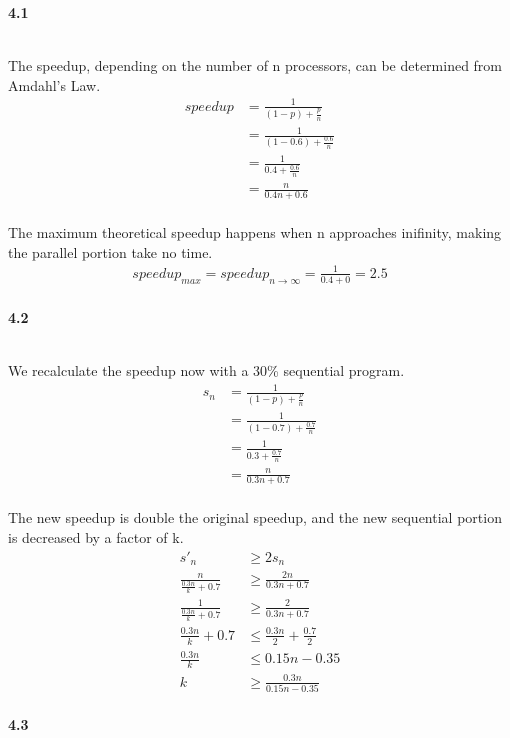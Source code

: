 \documentclass{article}
\begin{document}
{\raggedright \bf{4.1} } \\ 

The speedup, depending on the number of n processors, can be determined from Amdahl's Law.
\begin{align*}
    speedup &= \frac{1}{(1-p) + \frac{p}{n}} \\ 
            &= \frac{1}{(1-0.6) + \frac{0.6}{n}} \\
            &= \frac{1}{0.4 + \frac{0.6}{n}} \\
            &= \frac{n}{0.4n + 0.6} \\ 
\end{align*}

The maximum theoretical speedup happens when n approaches inifinity, making the parallel portion take no time. 
\begin{align*}
    speedup_{max} = speedup_{n \rightarrow \infty } = \frac{1}{0.4 + 0} = 2.5 \\ 
\end{align*}


{\raggedright \bf{4.2} } \\ 

We recalculate the speedup now with a 30\% sequential program.
\begin{align*}
    s_n &= \frac{1}{(1-p) + \frac{p}{n}} \\ 
        &= \frac{1}{(1-0.7) + \frac{0.7}{n}} \\ 
        &= \frac{1}{0.3 + \frac{0.7}{n}} \\ 
        &= \frac{n}{0.3n + 0.7} \\ 
\end{align*}

The new speedup is double the original speedup, and the new sequential portion is decreased by a factor of k.
\begin{align*}
    s'_n &\ge 2s_n \\
    \frac{n}{\frac{0.3n}{k} + 0.7} &\ge \frac{2n}{0.3n + 0.7} \\ 
    \frac{1}{\frac{0.3n}{k} + 0.7} &\ge \frac{2}{0.3n + 0.7} \\ 
    \frac{0.3n}{k} + 0.7 &\le \frac{0.3n}{2} + \frac{0.7}{2} \\ 
    \frac{0.3n}{k} &\le 0.15n - 0.35 \\ 
    k &\ge \frac{0.3n}{0.15n - 0.35} \\ 
\end{align*}


{\raggedright \bf{4.3} } \\ 
\end{document}
